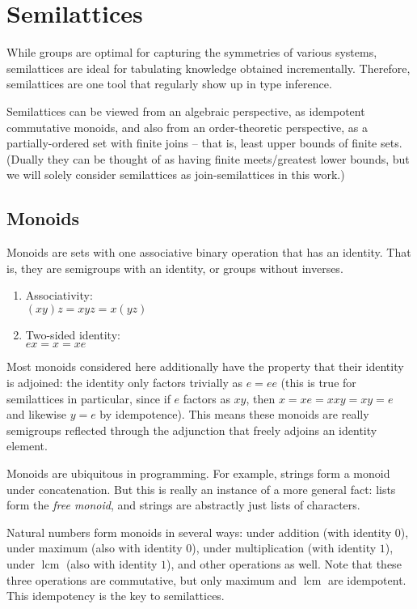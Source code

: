 \documentclass[11pt, twoside, reqno]{book}
\begin{document}
\section{Semilattices}

While groups are optimal for capturing the symmetries of various systems, semilattices are ideal for tabulating knowledge obtained incrementally.
Therefore, semilattices are one tool that regularly show up in type inference.

Semilattices can be viewed from an algebraic perspective, as idempotent commutative monoids, and also from an order-theoretic perspective, as a partially-ordered set with finite joins -- that is, least upper bounds of finite sets.
(Dually they can be thought of as having finite meets/greatest lower bounds, but we will solely consider semilattices as join-semilattices in this work.)

\subsection{Monoids}

Monoids are sets with one associative binary operation that has an identity.
That is, they are semigroups with an identity, or groups without inverses.
\begin{enumerate}
\item Associativity:\\
  \((xy)z = xyz = x(yz)\)
\item Two-sided identity:\\
  \(ex = x = xe\)
\end{enumerate}

Most monoids considered here additionally have the property that their identity is adjoined: the identity only factors trivially as \(e = ee\) (this is true for semilattices in particular, since if \(e\) factors as \(xy\), then \(x = xe = xxy = xy = e\) and likewise \(y = e\) by idempotence).
This means these monoids are really semigroups reflected through the adjunction that freely adjoins an identity element.

Monoids are ubiquitous in programming.
For example, strings form a monoid under concatenation.
But this is really an instance of a more general fact: lists form the \emph{free monoid}, and strings are abstractly just lists of characters.

Natural numbers form monoids in several ways: under addition (with identity \(0\)), under maximum (also with identity \(0\)), under multiplication (with identity \(1\)), under \(\mathop{lcm}\) (also with identity \(1\)), and other operations as well.
Note that these three operations are commutative, but only maximum and \(\mathop{lcm}\) are idempotent.
This idempotency is the key to semilattices.
\end{document}
